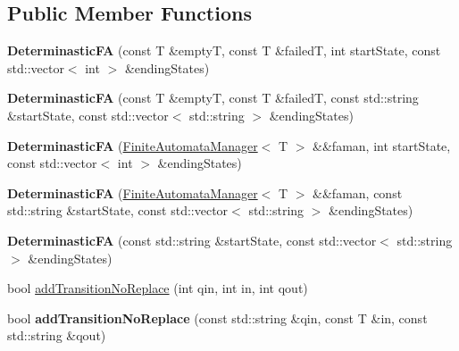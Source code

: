 \subsection*{Public Member Functions}
\begin{DoxyCompactItemize}
\item 
\mbox{\label{classx2_1_1_determinastic_f_a_a26fca3362b7a400ba88d7eef9d9cccef}} 
{\bfseries Determinastic\+FA} (const T \&emptyT, const T \&failedT, int start\+State, const std\+::vector$<$ int $>$ \&ending\+States)
\item 
\mbox{\label{classx2_1_1_determinastic_f_a_a9564061d48e93d38a9de005aaaecb2e4}} 
{\bfseries Determinastic\+FA} (const T \&emptyT, const T \&failedT, const std\+::string \&start\+State, const std\+::vector$<$ std\+::string $>$ \&ending\+States)
\item 
\mbox{\label{classx2_1_1_determinastic_f_a_aa2affbfd0b67bd1a604c015ff4c3764f}} 
{\bfseries Determinastic\+FA} (\hyperlink{classx2_1_1_finite_automata_manager}{Finite\+Automata\+Manager}$<$ T $>$ \&\&faman, int start\+State, const std\+::vector$<$ int $>$ \&ending\+States)
\item 
\mbox{\label{classx2_1_1_determinastic_f_a_a3abf4b94adfa0e9d88f48d5db31390d1}} 
{\bfseries Determinastic\+FA} (\hyperlink{classx2_1_1_finite_automata_manager}{Finite\+Automata\+Manager}$<$ T $>$ \&\&faman, const std\+::string \&start\+State, const std\+::vector$<$ std\+::string $>$ \&ending\+States)
\item 
\mbox{\label{classx2_1_1_determinastic_f_a_abca31bc4345ac45dd64d5af48c4adf01}} 
{\bfseries Determinastic\+FA} (const std\+::string \&start\+State, const std\+::vector$<$ std\+::string $>$ \&ending\+States)
\item 
bool \hyperlink{classx2_1_1_determinastic_f_a_a830e6d1612b263d9ef126b29709f4c46}{add\+Transition\+No\+Replace} (int qin, int in, int qout)
\item 
\mbox{\label{classx2_1_1_determinastic_f_a_adc6cda2e6a84bacff95f5430c4cbadd6}} 
bool {\bfseries add\+Transition\+No\+Replace} (const std\+::string \&qin, const T \&in, const std\+::string \&qout)

\end{DoxyCompactItemize}
